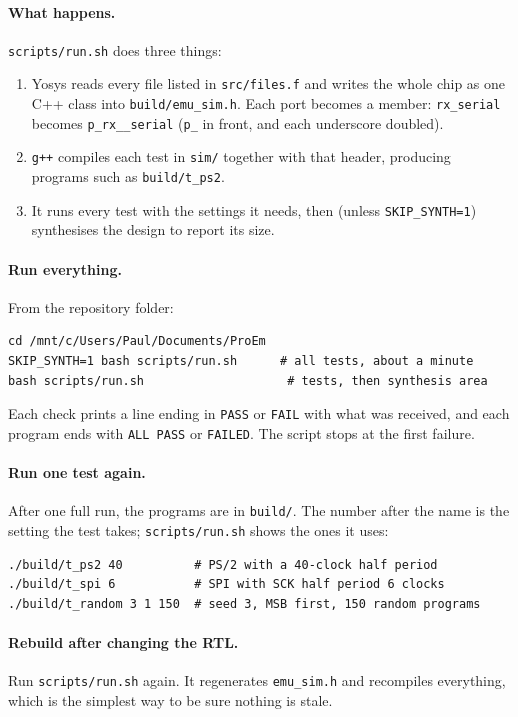 \documentclass[11pt,a4paper]{article}
\newcommand{\file}[1]{\texttt{#1}}
\begin{document}
\paragraph{What happens.} \file{scripts/run.sh} does three things:
\begin{enumerate}
\item Yosys reads every file listed in \file{src/files.f} and writes the whole chip as one C++ class into \file{build/emu\_sim.h}. Each port becomes a member: \texttt{rx\_serial} becomes \texttt{p\_rx\_\_serial} (\texttt{p\_} in front, and each underscore doubled).
\item \texttt{g++} compiles each test in \file{sim/} together with that header, producing programs such as \file{build/t\_ps2}.
\item It runs every test with the settings it needs, then (unless \texttt{SKIP\_SYNTH=1}) synthesises the design to report its size.
\end{enumerate}

\paragraph{Run everything.} From the repository folder:
\begin{lstlisting}
cd /mnt/c/Users/Paul/Documents/ProEm
SKIP_SYNTH=1 bash scripts/run.sh      # all tests, about a minute
bash scripts/run.sh                    # tests, then synthesis area
\end{lstlisting}
Each check prints a line ending in \texttt{PASS} or \texttt{FAIL} with what was received, and each program ends with \texttt{ALL PASS} or \texttt{FAILED}. The script stops at the first failure.

\paragraph{Run one test again.} After one full run, the programs are in \file{build/}. The number after the name is the setting the test takes; \file{scripts/run.sh} shows the ones it uses:
\begin{lstlisting}
./build/t_ps2 40          # PS/2 with a 40-clock half period
./build/t_spi 6           # SPI with SCK half period 6 clocks
./build/t_random 3 1 150  # seed 3, MSB first, 150 random programs
\end{lstlisting}

\paragraph{Rebuild after changing the RTL.} Run \file{scripts/run.sh} again. It regenerates \file{emu\_sim.h} and recompiles everything, which is the simplest way to be sure nothing is stale.
\end{document}
